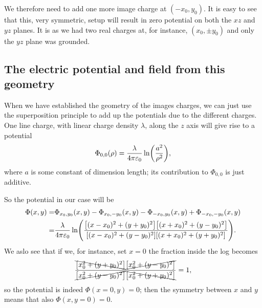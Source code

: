 \documentclass[11pt,letter, swedish, english
]{article}
\newcommand{\enaught}{\ensuremath\varepsilon_0}
\begin{document}
We therefore need to add one more image charge at $(-x_0, y_0)$. It is
easy to see that this, very symmetric, setup will result in zero
potential on both the $xz$ and $yz$ planes. It is as we had two real
charges at, for instance, $(x_0, \pm{y_0})$ and only the $yz$ plane
was grounded. 


\subsection{The electric potential and field from this geometry}
When we have established the geometry of the images charges, we can
just use the superposition principle to add up the potentials due to
the different charges. One line charge, with linear charge density
$\lambda$, along the $z$ axis will give rise to a potential
\begin{equation}
\Phi_{0,0}(\rho)=\frac{\lambda}{4\pi\enaught}\ln(\frac{a^2}{\rho^2}),
\end{equation}
where $a$ is some constant of dimension length; its contribution
to $\Phi_{0,0}$ is just additive.

So the potential in our case will be
\begin{equation}
\begin{aligned}
\Phi(x, y)=&\Phi_{x_0,y_0}(x, y)-\Phi_{x_0,-y_0}(x, y)
-\Phi_{-x_0,y_0}(x, y)+\Phi_{-x_0,-y_0}(x, y)\\
=&\frac{\lambda}{4\pi\enaught}
\ln(\frac{\qty[(x-x_0)^2+(y+y_0)^2]\qty[(x+x_0)^2+(y-y_0)^2]}
{\qty[(x-x_0)^2+(y-y_0)^2]\qty[(x+x_0)^2+(y+y_0)^2]}).
\end{aligned}
\end{equation}
We aslo see that if we, for instance, set $x=0$ the fraction inside
the log becomes
\begin{equation}
\frac{\bcancel{\qty[x_0^2+(y+y_0)^2]}\cancel{\qty[x_0^2+(y-y_0)^2]}}
{\cancel{\qty[x_0^2+(y-y_0)^2]}\bcancel{\qty[x_0^2+(y+y_0)^2]}}
=1,
\end{equation}
so the potential is indeed $\Phi(x=0, y)=0$; then the symmetry between
$x$ and $y$ means that also $\Phi(x, y=0)=0$.
\end{document}
